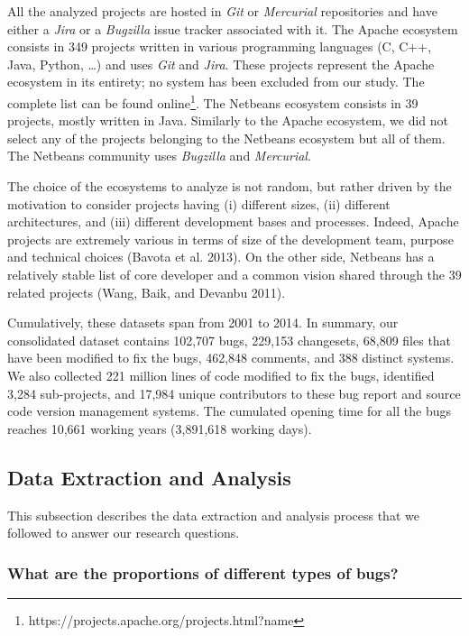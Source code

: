 \documentclass[natbib]{svjour3}
\begin{document}
All the analyzed projects are hosted in \emph{Git} or \emph{Mercurial}
repositories and have either a \emph{Jira} or a \emph{Bugzilla} issue
tracker associated with it. The Apache ecosystem consists in 349
projects written in various programming languages (C, C++, Java, Python,
\ldots{}) and uses \emph{Git} and \emph{Jira}. These projects represent
the Apache ecosystem in its entirety; no system has been excluded from
our study. The complete list can be found
online\footnote{https://projects.apache.org/projects.html?name}. The
Netbeans ecosystem consists in 39 projects, mostly written in Java.
Similarly to the Apache ecosystem, we did not select any of the projects
belonging to the Netbeans ecosystem but all of them. The Netbeans
community uses \emph{Bugzilla} and \emph{Mercurial}.

The choice of the ecosystems to analyze is not random, but rather driven
by the motivation to consider projects having (i) different sizes, (ii)
different architectures, and (iii) different development bases and
processes. Indeed, Apache projects are extremely various in terms of
size of the development team, purpose and technical choices (Bavota et
al. 2013). On the other side, Netbeans has a relatively stable list of
core developer and a common vision shared through the 39 related
projects (Wang, Baik, and Devanbu 2011).

Cumulatively, these datasets span from 2001 to 2014. In summary, our
consolidated dataset contains 102,707 bugs, 229,153 changesets, 68,809
files that have been modified to fix the bugs, 462,848 comments, and 388
distinct systems. We also collected 221 million lines of code modified
to fix the bugs, identified 3,284 sub-projects, and 17,984 unique
contributors to these bug report and source code version management
systems. The cumulated opening time for all the bugs reaches 10,661
working years (3,891,618 working days).

\subsection{Data Extraction and
Analysis}\label{data-extraction-and-analysis}

This subsection describes the data extraction and analysis process that
we followed to answer our research questions.

\subsubsection{What are the proportions of different types of
bugs?}\label{what-are-the-proportions-of-different-types-of-bugs}
\end{document}
